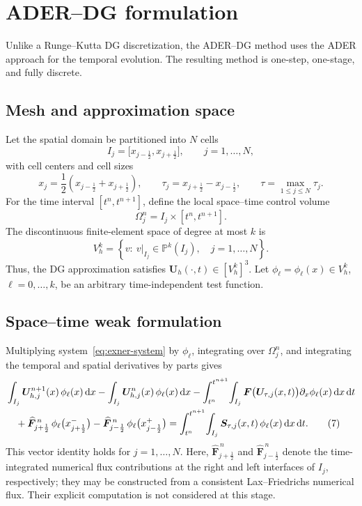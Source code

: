 \documentclass[11pt]{article}
\newcommand{\dt}{\,\mathrm{d}t}
\newcommand{\dx}{\,\mathrm{d}x}
\begin{document}
\section{ADER--DG formulation}

Unlike a Runge--Kutta DG discretization, the ADER--DG method uses the ADER
approach for the temporal evolution. The resulting method is one-step,
one-stage, and fully discrete.

\subsection{Mesh and approximation space}

Let the spatial domain be partitioned into \(N\) cells
\[
    I_j=\bigl[x_{j-\frac12},x_{j+\frac12}\bigr],
    \qquad j=1,\ldots,N,
\]
with cell centers and cell sizes
\[
    x_j=\frac12\left(x_{j-\frac12}+x_{j+\frac12}\right),
    \qquad
    \tau_j=x_{j+\frac12}-x_{j-\frac12},
    \qquad
    \tau=\max_{1\leq j\leq N}\tau_j.
\]
For the time interval \([t^n,t^{n+1}]\), define the local space--time control
volume
\[
    \Omega_j^n=I_j\times[t^n,t^{n+1}].
\]
The discontinuous finite-element space of degree at most \(k\) is
\[
    V_h^k
    =\left\{
        v:\ v\big|_{I_j}\in\mathbb P^k(I_j),
        \quad j=1,\ldots,N
      \right\}.
\]
Thus, the DG approximation satisfies
\(\bm U_h(\cdot,t)\in[V_h^k]^3\). Let
\(\phi_\ell=\phi_\ell(x)\in V_h^k\), \(\ell=0,\ldots,k\), be an arbitrary
time-independent test function.

\subsection{Space--time weak formulation}

Multiplying system~\eqref{eq:exner-system} by \(\phi_\ell\), integrating over
\(\Omega_j^n\), and integrating the temporal and spatial derivatives by parts
gives
\begin{align}
    &\int_{I_j}
        \bm U_{h,j}^{n+1}(x)\,\phi_\ell(x)\dx
    -
    \int_{I_j}
        \bm U_{h,j}^{n}(x)\,\phi_\ell(x)\dx     - \int_{t^n}^{t^{n+1}}\!\int_{I_j}
        \bm F\bigl(\bm U_{\tau,j}(x,t)\bigr)
        \partial_x\phi_\ell(x)\dx\dt
    \notag\\
    &\quad
    +
    \widehat{\bm F}_{j+\frac12}^{\,n}\,
        \phi_\ell\bigl(x_{j+\frac12}^{-}\bigr)
    -
    \widehat{\bm F}_{j-\frac12}^{\,n}\,
        \phi_\ell\bigl(x_{j-\frac12}^{+}\bigr) =
    \int_{t^n}^{t^{n+1}}\!\int_{I_j}
        \bm S_{\tau,j}(x,t)\,
        \phi_\ell(x)\dx\dt .
    \tag{7}
    \label{eq:ader-dg-weak-form}
\end{align}
This vector identity holds for \(j=1,\ldots,N\). Here,
\(\widehat{\bm F}_{j+\frac12}^{\,n}\) and
\(\widehat{\bm F}_{j-\frac12}^{\,n}\) denote the time-integrated numerical
flux contributions at the right and left interfaces of \(I_j\), respectively;
they may be constructed from a consistent Lax--Friedrichs numerical flux. Their
explicit computation is not considered at this stage.
\end{document}

